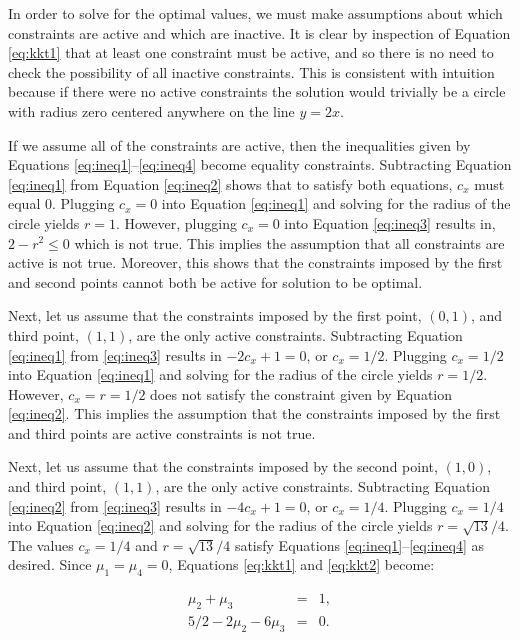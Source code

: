 \documentclass{article}
\begin{document}
\begin{enumerate}[a)]
In order to solve for the optimal values, we must make assumptions about which constraints are active and which are inactive.
It is clear by inspection of Equation \ref{eq:kkt1} that at least one constraint must be active, and so there is no need to check the possibility of all inactive constraints.
This is consistent with intuition because if there were no active constraints the solution would trivially be a circle with radius zero centered anywhere on the line $y=2x$.

If we assume all of the constraints are active, then the inequalities given by Equations \ref{eq:ineq1}--\ref{eq:ineq4} become equality constraints.
Subtracting Equation \ref{eq:ineq1} from Equation \ref{eq:ineq2} shows that to satisfy both equations, $c_x$ must equal 0.
Plugging $c_x = 0$ into Equation \ref{eq:ineq1} and solving for the radius of the circle yields $r = 1$.
However, plugging $c_x = 0$ into Equation \ref{eq:ineq3} results in, $2 - r^2 \le 0$ which is not true.
This implies the assumption that all constraints are active is not true.
Moreover, this shows that the constraints imposed by the first and second points cannot both be active for solution to be optimal.

Next, let us assume that the constraints imposed by the first point, $(0,1)$, and third point, $(1,1)$, are the only active constraints.
Subtracting Equation \ref{eq:ineq1} from \ref{eq:ineq3} results in $-2c_x + 1 = 0$, or $c_x = 1/2$.
Plugging $c_x = 1/2$ into Equation \ref{eq:ineq1} and solving for the radius of the circle yields $r = 1/2$.
However, $c_x = r = 1/2$ does not satisfy the constraint given by Equation \ref{eq:ineq2}.
This implies the assumption that the constraints imposed by the first and third points are active constraints is not true.

Next, let us assume that the constraints imposed by the second point, $(1,0)$, and third point, $(1,1)$, are the only active constraints.
Subtracting Equation \ref{eq:ineq2} from \ref{eq:ineq3} results in $-4c_x + 1 = 0$, or $c_x = 1/4$.
Plugging $c_x = 1/4$ into Equation \ref{eq:ineq2} and solving for the radius of the circle yields $r = \sqrt{13}/4$.
The values $c_x = 1/4$ and $r = \sqrt{13}/4$ satisfy Equations \ref{eq:ineq1}--\ref{eq:ineq4} as desired.
Since $\mu_1 = \mu_4 = 0$, Equations \ref{eq:kkt1} and \ref{eq:kkt2} become: 

\begin{eqnarray*}
	\mu_2 + \mu_3 &=& 1,\\
	5/2 - 2\mu_2 - 6\mu_3 &=& 0.
\end{eqnarray*}


\end{enumerate}
\end{document}
